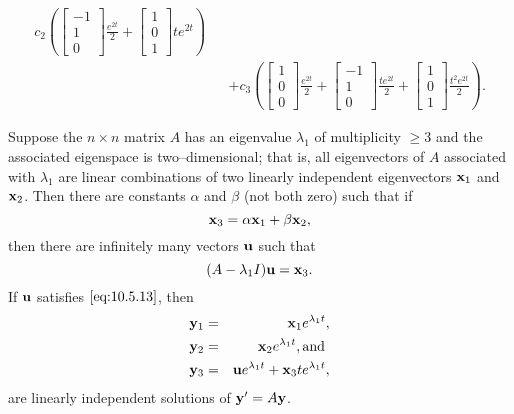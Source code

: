 \documentclass{ximera}
\begin{document}
\begin{example}
\begin{explanation}
\begin{eqnarray*}
c_2\left(\begin{bmatrix}-1\\1\\0\end{bmatrix}\frac{e^{2t}}{2}+\begin{bmatrix}1\\0\\1\end{bmatrix}te^{2t}\right)\\
&&+c_3\left(\begin{bmatrix}1\\0\\0\end{bmatrix}\frac{e^{2t}}{2}+
\begin{bmatrix}-1\\1\\0\end{bmatrix}\frac{te^{2t}}{2}+\begin{bmatrix}1\\0\\1\end{bmatrix}\frac{t^2e^{2t}}{2}\right).
\end{eqnarray*}
\end{explanation}
\end{example}

\begin{theorem}\label{thmtype:10.5.3}
Suppose the $n\times n$ matrix $A$ has an eigenvalue $\lambda_1$ of
multiplicity $\geq 3$ and the associated eigenspace is
two--dimensional; that is, all eigenvectors of $A$ associated with
$\lambda_1$ are linear combinations of two linearly independent
eigenvectors ${\bf x}_1$ and ${\bf x}_2$. Then there are constants
$\alpha$ and $\beta$ (not both zero) such that if
\begin{equation}\label{eq:10.5.12}
{\bf x}_3=\alpha{\bf x}_1+\beta{\bf x}_2,
\end{equation}
then there are infinitely many vectors ${\bf u}$ such that
\begin{equation}\label{eq:10.5.13}
(A-\lambda_1I){\bf u}={\bf x}_3.
\end{equation}
If ${\bf u}$ satisfies  $\eqref{eq:10.5.13}$, then
\begin{eqnarray}
{\bf y}_1&=&{\bf x}_1 e^{\lambda_1t},\nonumber\\
{\bf y}_2&=&{\bf x}_2e^{\lambda_1t},\mbox{and }\nonumber\\
{\bf y}_3&=&{\bf u}e^{\lambda_1t}+{\bf x}_3te^{\lambda_1t}\label{eq:10.5.14},
\end{eqnarray}
are linearly independent solutions of  ${\bf y}'=A{\bf y}$.
\end{theorem}
\end{document}
